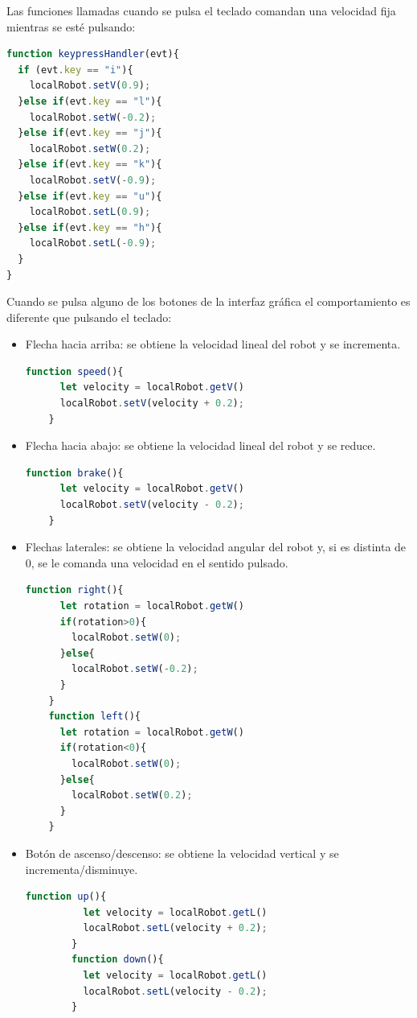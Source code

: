 Las funciones llamadas cuando se pulsa el teclado comandan una velocidad fija mientras se esté pulsando: 

\begin{lstlisting}[language=javascript,label=list:teclado]
function keypressHandler(evt){
  if (evt.key == "i"){
    localRobot.setV(0.9);
  }else if(evt.key == "l"){
    localRobot.setW(-0.2);
  }else if(evt.key == "j"){
    localRobot.setW(0.2);
  }else if(evt.key == "k"){
    localRobot.setV(-0.9);
  }else if(evt.key == "u"){
    localRobot.setL(0.9);
  }else if(evt.key == "h"){
    localRobot.setL(-0.9);
  }
}
\end{lstlisting}

Cuando se pulsa alguno de los botones de la interfaz gráfica el comportamiento es diferente que pulsando el teclado: 
\begin{itemize}
    \item Flecha hacia arriba: se obtiene la velocidad lineal del robot y se incrementa.
    \begin{lstlisting}[language=javascript,label=list:speed]
    function speed(){
      let velocity = localRobot.getV()
      localRobot.setV(velocity + 0.2);
    }
    \end{lstlisting}
    \item Flecha hacia abajo: se obtiene la velocidad lineal del robot y se reduce. 
    \begin{lstlisting}[language=javascript,label=list:brake]
   function brake(){
      let velocity = localRobot.getV()
      localRobot.setV(velocity - 0.2);
    }
    \end{lstlisting}
    \item Flechas laterales: se obtiene la velocidad angular del robot y, si es distinta de 0, se le comanda una velocidad en el sentido pulsado. 
    \begin{lstlisting}[language=javascript,label=list:right]
   function right(){
      let rotation = localRobot.getW()
      if(rotation>0){
        localRobot.setW(0);
      }else{
        localRobot.setW(-0.2);
      }
    }
    function left(){
      let rotation = localRobot.getW()
      if(rotation<0){
        localRobot.setW(0);
      }else{
        localRobot.setW(0.2);
      }
    }
    \end{lstlisting}
    \item Botón de ascenso/descenso: se obtiene la velocidad vertical y se incrementa/disminuye.
    \begin{lstlisting}[language=javascript,label=list:up]
        function up(){
          let velocity = localRobot.getL()
          localRobot.setL(velocity + 0.2);
        }
        function down(){
          let velocity = localRobot.getL()
          localRobot.setL(velocity - 0.2);
        }

    \end{lstlisting}
    \end{itemize}

